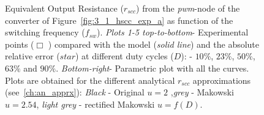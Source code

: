 \begin{figure}[!h]
\centering
    \begin{subfigure}{0.45\textwidth}
        
    \end{subfigure}
    \hfill
    \begin{subfigure}{0.45\textwidth}
        
    \end{subfigure}

    \begin{subfigure}{0.45\textwidth}
        
    \end{subfigure}
    \hfill
    \begin{subfigure}{0.45\textwidth}
        
    \end{subfigure}

        \begin{subfigure}{0.45\textwidth}
        
    \end{subfigure}
    \hfill
    \begin{subfigure}{0.45\textwidth}
        
    \end{subfigure}

\caption{Equivalent Output Resistance ($r_{scc}$) from the \emph{pwm}-node of the converter of Figure~\ref{fig:3_1_hscc_exp_a} as function of the switching frequency ($f_{sw}$). \emph{Plots 1-5 top-to-bottom}-  Experimental points ($\Box$ ) compared with the model (\emph{solid line}) and the absolute relative error ($star$)  at different duty cycles ($D$): - $10\%$, $23\%$, $50\%$, $63\%$ and $90\%$. \emph{Bottom-right}- Parametric plot with all the curves. Plots are obtained for the different analytical $r_{scc}$ approximations (see~\ref{ch:an_apprx}): \emph{Black} - Original $u=2$ ,\emph{grey} - Makowski  $u=2.54$, \emph{light grey} - rectified Makowski $u=f(D)$. }\label{fig:exp_rscc_pwm_node_fsw}
\end{figure}
\clearpage
